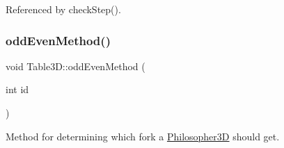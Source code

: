 Referenced by check\+Step().

\mbox{\label{class_table3_d_acc4b9ab7a1110676580d64a67d4c1168}} 
\subsubsection{\texorpdfstring{odd\+Even\+Method()}{oddEvenMethod()}}
{\footnotesize\ttfamily void Table3\+D\+::odd\+Even\+Method (\begin{DoxyParamCaption}\item[{int}]{id }\end{DoxyParamCaption})}



Method for determining which fork a \hyperlink{class_philosopher3_d}{Philosopher3D} should get. 


